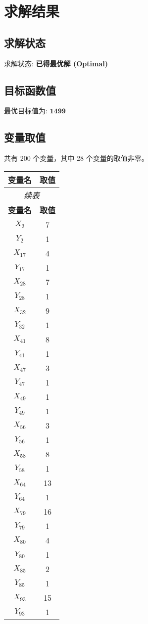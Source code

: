 \documentclass[a4paper,10pt]{article}
\begin{document}
\section{求解结果}

\subsection{求解状态}

求解状态: \textbf{已得最优解 (Optimal)}

\subsection{目标函数值}

最优目标值为: $\mathbf{1499}$

\subsection{变量取值}

共有 200 个变量，其中 28 个变量的取值非零。

\begin{center}
\begin{longtable}{cc}
\toprule
\textbf{变量名} & \textbf{取值} \\
\midrule
\endfirsthead
\multicolumn{2}{c}{\textit{续表}} \\
\toprule
\textbf{变量名} & \textbf{取值} \\
\midrule
\endhead
\bottomrule
\endfoot
\bottomrule
\endlastfoot
$X_{2}$ & 7 \\
$Y_{2}$ & 1 \\
$X_{17}$ & 4 \\
$Y_{17}$ & 1 \\
$X_{28}$ & 7 \\
$Y_{28}$ & 1 \\
$X_{32}$ & 9 \\
$Y_{32}$ & 1 \\
$X_{41}$ & 8 \\
$Y_{41}$ & 1 \\
$X_{47}$ & 3 \\
$Y_{47}$ & 1 \\
$X_{49}$ & 1 \\
$Y_{49}$ & 1 \\
$X_{56}$ & 3 \\
$Y_{56}$ & 1 \\
$X_{58}$ & 8 \\
$Y_{58}$ & 1 \\
$X_{64}$ & 13 \\
$Y_{64}$ & 1 \\
$X_{79}$ & 16 \\
$Y_{79}$ & 1 \\
$X_{80}$ & 4 \\
$Y_{80}$ & 1 \\
$X_{85}$ & 2 \\
$Y_{85}$ & 1 \\
$X_{93}$ & 15 \\
$Y_{93}$ & 1 \\
\end{longtable}
\end{center}
\end{document}
